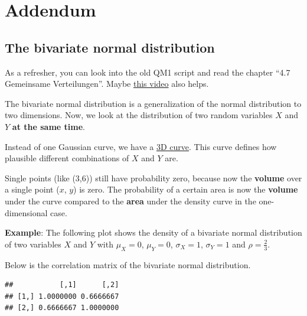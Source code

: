 \documentclass[
]{book}
\begin{document}
\section{Addendum}\label{addendum}

\subsection{The bivariate normal distribution}\label{bivariate_normal}

As a refresher, you can look into the old QM1 script and read the
chapter ``4.7 Gemeinsame Verteilungen''.
Maybe \href{https://www.youtube.com/watch?v=SP2GKq8xJ5I&ab_channel=StatisticsNinja}{this video}
also helps.

The bivariate normal distribution is a generalization of the normal distribution to two dimensions.
Now, we look at the distribution of two random variables \(X\) and \(Y\) \textbf{at the same time}.

Instead of one Gaussian curve, we have a
\href{https://en.wikipedia.org/wiki/Multivariate_normal_distribution\#/media/File:Multivariate_Gaussian.png}{3D curve}.
This curve defines how plausible different combinations of \(X\) and \(Y\) are.

Single points (like (3,6)) still have probability zero, because now the \textbf{volume} over a single point
(\(x\), \(y\)) is zero. The probability of a certain area is now the \textbf{volume} under the
curve compared to the \textbf{area} under the density curve in the one-dimensional case.

\textbf{Example}: The following plot shows the density of a bivariate normal distribution of
two variables \(X\) and \(Y\)
with \(\mu_X = 0\), \(\mu_Y = 0\), \(\sigma_X = 1\), \(\sigma_Y = 1\) and \(\rho = \frac{2}{3}\).

Below is the correlation matrix of the bivariate normal distribution.

\begin{verbatim}
##           [,1]      [,2]
## [1,] 1.0000000 0.6666667
## [2,] 0.6666667 1.0000000
\end{verbatim}
\end{document}
